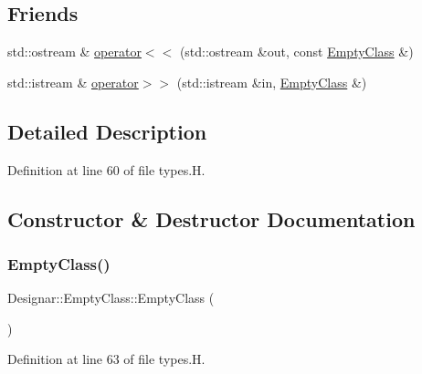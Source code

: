 \subsection*{Friends}
\begin{DoxyCompactItemize}
\item 
std\+::ostream \& \hyperlink{class_designar_1_1_empty_class_a1927797e0167a693cd74b5227218f196}{operator$<$$<$} (std\+::ostream \&out, const \hyperlink{class_designar_1_1_empty_class}{Empty\+Class} \&)
\item 
std\+::istream \& \hyperlink{class_designar_1_1_empty_class_aa3fc576ae898cf56f66f6ebf12251803}{operator$>$$>$} (std\+::istream \&in, \hyperlink{class_designar_1_1_empty_class}{Empty\+Class} \&)
\end{DoxyCompactItemize}


\subsection{Detailed Description}


Definition at line 60 of file types.\+H.



\subsection{Constructor \& Destructor Documentation}
\mbox{\label{class_designar_1_1_empty_class_a88d846866a1e4872224ec2b4e750eba8}} 
\subsubsection{\texorpdfstring{Empty\+Class()}{EmptyClass()}\hspace{0.1cm}{\footnotesize\ttfamily [1/3]}}
{\footnotesize\ttfamily Designar\+::\+Empty\+Class\+::\+Empty\+Class (\begin{DoxyParamCaption}{ }\end{DoxyParamCaption})\hspace{0.3cm}{\ttfamily [inline]}}



Definition at line 63 of file types.\+H.

\mbox{\label{class_designar_1_1_empty_class_a0a0b2cec90aebb02e6f5e3371087b221}} 
